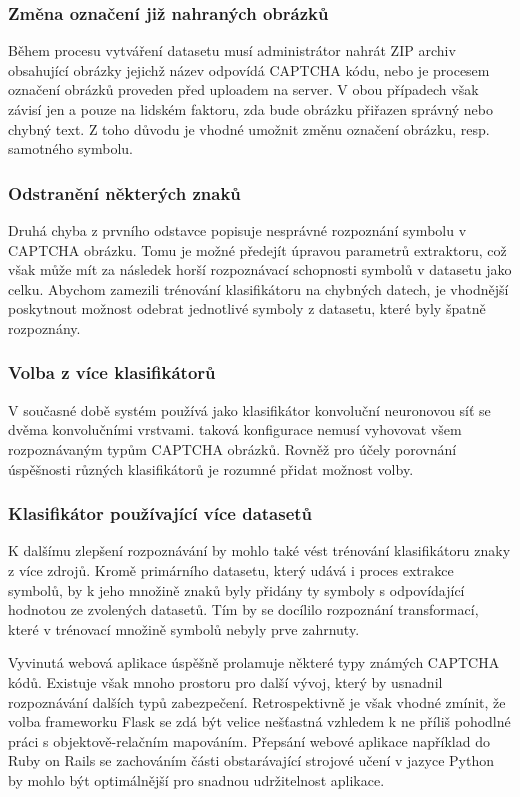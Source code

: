 \documentclass[
  field=ainfp,
  master=true,
  biblatex,
  sourcecodes=false,
  theorems=false,
  glossaries,
  index
]{kidiplom}
\begin{document}
\subsubsection*{Změna označení již nahraných obrázků} 
Během procesu vytváření datasetu musí administrátor nahrát ZIP archiv obsahující obrázky jejichž název odpovídá CAPTCHA kódu, nebo je procesem označení obrázků proveden před uploadem na server. V obou případech však závisí jen a pouze na lidském faktoru, zda bude obrázku přiřazen správný nebo chybný text. Z toho důvodu je vhodné umožnit změnu označení obrázku, resp. samotného symbolu.

\subsubsection*{Odstranění některých znaků}
Druhá chyba z prvního odstavce popisuje nesprávné rozpoznání symbolu v CAPTCHA obrázku. Tomu je možné předejít úpravou parametrů extraktoru, což však může mít za následek horší rozpoznávací schopnosti symbolů v datasetu jako celku. Abychom zamezili trénování klasifikátoru na chybných datech, je vhodnější poskytnout možnost odebrat jednotlivé symboly z datasetu, které byly špatně rozpoznány.

\subsubsection*{Volba z více klasifikátorů} 
V současné době systém používá jako klasifikátor konvoluční neuronovou síť se dvěma konvolučními vrstvami. taková konfigurace nemusí vyhovovat všem rozpoznávaným typům CAPTCHA obrázků. Rovněž pro účely porovnání úspěšnosti různých klasifikátorů je rozumné přidat možnost volby. 

\subsubsection*{Klasifikátor používající více datasetů} 
K dalšímu zlepšení rozpoznávání by mohlo také vést trénování klasifikátoru znaky z více zdrojů. Kromě primárního datasetu, který udává i proces extrakce symbolů, by k jeho množině znaků byly přidány ty symboly s odpovídající hodnotou ze zvolených datasetů. Tím by se docílilo rozpoznání transformací, které v trénovací množině symbolů nebyly prve zahrnuty.


\begin{kiconclusions}
Vyvinutá webová aplikace úspěšně prolamuje některé typy známých CAPTCHA kódů. Existuje však mnoho prostoru pro další vývoj, který by usnadnil rozpoznávání dalších typů zabezpečení. Retrospektivně je však vhodné zmínit, že volba frameworku Flask se zdá být velice nešťastná vzhledem k ne příliš pohodlné práci s objektově-relačním mapováním. Přepsání webové aplikace například do Ruby on Rails se zachováním části obstarávající strojové učení v jazyce Python by mohlo být optimálnější pro snadnou udržitelnost aplikace.
\end{kiconclusions}
\end{document}
